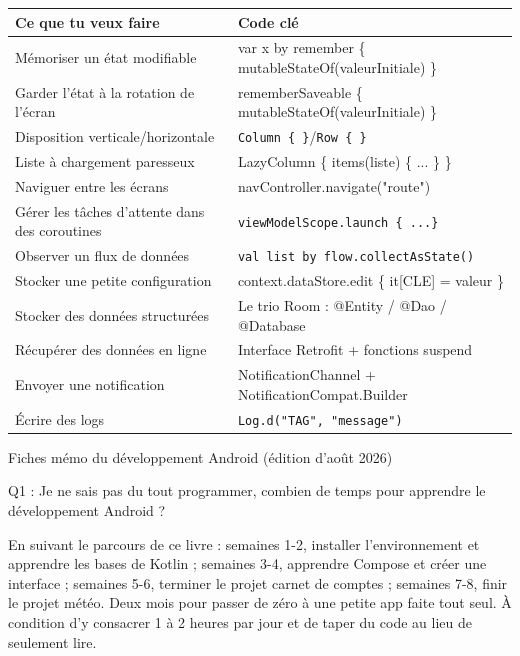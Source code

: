 


\begin{center}
\begin{tabularx}{\linewidth}{|X|X|}
\hline
\textbf{Ce que tu veux faire} & \textbf{Code clé} \tabularnewline
\hline
Mémoriser un état modifiable & var x by remember \{ mutableStateOf(valeurInitiale) \} \tabularnewline
Garder l’état à la rotation de l’écran & rememberSaveable \{ mutableStateOf(valeurInitiale) \} \tabularnewline
Disposition verticale/horizontale & \texttt{Column \{ \}}/\texttt{Row \{ \}} \tabularnewline
Liste à chargement paresseux & LazyColumn \{ items(liste) \{ ... \} \} \tabularnewline
Naviguer entre les écrans & navController.navigate("route") \tabularnewline
Gérer les tâches d’attente dans des coroutines & \texttt{viewModelScope.\allowbreak launch \{ .\allowbreak .\allowbreak .\allowbreak  \}} \tabularnewline
Observer un flux de données & \texttt{val list by flow.\allowbreak collectAsState()} \tabularnewline
Stocker une petite configuration & context.dataStore.edit \{ it[CLE] = valeur \} \tabularnewline
Stocker des données structurées & Le trio Room : @Entity / @Dao / @Database \tabularnewline
Récupérer des données en ligne & Interface Retrofit + fonctions suspend \tabularnewline
Envoyer une notification & NotificationChannel + NotificationCompat.Builder \tabularnewline
Écrire des logs & \texttt{Log.\allowbreak d("TAG", "message")} \tabularnewline
\hline
\end{tabularx}
\end{center}

\begin{center}\small\color{gray}Fiches mémo du développement Android (édition d’août 2026)\end{center}


Q1 : Je ne sais pas du tout programmer, combien de temps pour apprendre le développement Android ?

En suivant le parcours de ce livre : semaines 1-2, installer l’environnement et apprendre les bases de Kotlin ; semaines 3-4, apprendre Compose et créer une interface ; semaines 5-6, terminer le projet carnet de comptes ; semaines 7-8, finir le projet météo. Deux mois pour passer de zéro à une petite app faite tout seul. À condition d’y consacrer 1 à 2 heures par jour et de taper du code au lieu de seulement lire.

